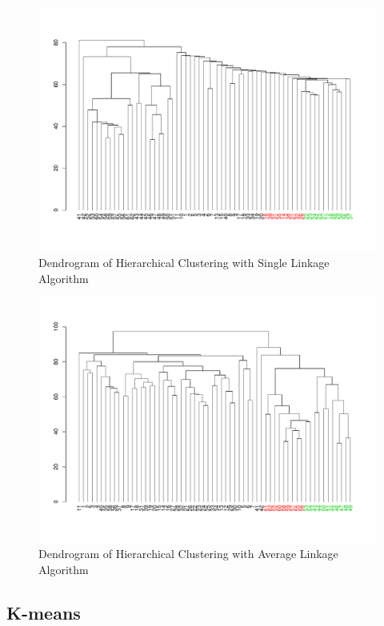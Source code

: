 \documentclass[11 pt,letterpaper,titlepage]{article} %
\begin{document}
    \begin{figure}[H]
        \centering
        \includegraphics[width=5in]{Figures/dendSingle.pdf}
        \caption{Dendrogram of Hierarchical Clustering with Single Linkage Algorithm}
        \label{fig:dend2}
    \end{figure}

    \begin{figure}[H]
        \centering
        \includegraphics[width=5in]{Figures/dendAverage.pdf}
        \caption{Dendrogram of Hierarchical Clustering with Average Linkage Algorithm}
        \label{fig:dend3}
    \end{figure}

    \subsection{K-means}
\end{document}
